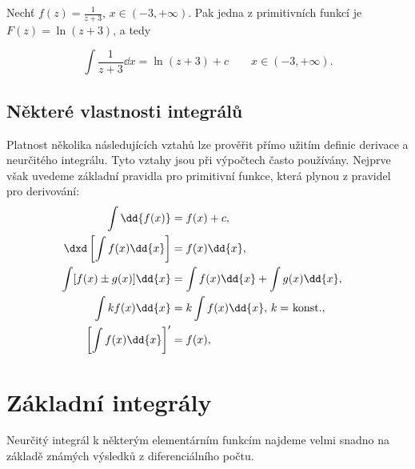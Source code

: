       Nechť \(f(z) = \frac{1}{z+3}\), \(x\in(-3, +\infty)\). Pak jedna z primitivních funkcí je
      \(F(z) = \ln(z+3)\), a tedy
      \begin{fleqn}[\parindent]
        \begin{equation*}
          \int\frac{1}{z+3}\dd{x} = \ln(z+3) + c \qquad x\in(-3, +\infty).
        \end{equation*}
      \end{fleqn}
    
    \subsection{Některé vlastnosti integrálů}  
      Platnost několika následujících vztahů lze prověřit přímo užitím deﬁnic derivace a neurčitého
      integrálu. Tyto vztahy jsou při výpočtech často používány. Nejprve však uvedeme základní
      pravidla pro primitivní funkce, která plynou z pravidel pro derivování:
      \begin{subequations}
        \begin{flalign}
          \int\dd{f(x)}                    
            &= f(x) + c,                                  &\label{mai:eq134} \\
          \dxd\left[\int f(x)\dd{x}\right] 
            &= f(x)\dd{x},                                &\label{mai:eq135} \\
          \int[f(x)\pm g(x)]\dd{x}
            &= \int f(x)\dd{x} + \int g(x)\dd{x},         &\label{mai:eq103} \\
          \int kf(x)\dd{x}      
            &=k\int f(x)\dd{x},\,\text{\(k=\) konst.},    &\label{mai:eq104}\raisetag{14pt} \\
          \left[\int f(x)\dd{x}\right]'    
            &= f(x),                                      &\label{mai:eq136}
        \end{flalign}
      \end{subequations}
      
  \section{Základní integrály}\label{mai:IchapVIIsecII} 
    Neurčitý integrál k některým elementárním funkcím najdeme velmi snadno na základě známých
    výsledků z diferenciálního počtu.
    
